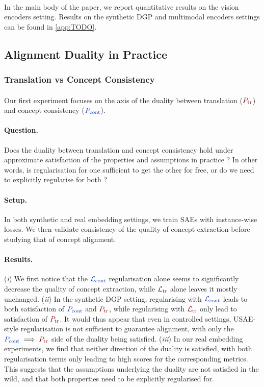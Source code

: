 \documentclass{article}
\begin{document}
\paragraph{} In the main body of the paper, we report quantitative results on the vision encoders setting. Results on the synthetic DGP and multimodal encoders settings can be found in \cref{app:TODO}.

\subsection{Alignment Duality in Practice}

\subsubsection{Translation vs Concept Consistency}
\label{sec:translation_vs_concept_consistency}

\paragraph{}Our first experiment focuses on the axis of the duality between translation ($\Ptr$) and concept consistency ($\Pcont$).
\paragraph{Question.} Does the duality between translation and concept consistency hold under approximate satisfaction of the properties and assumptions in practice ? In other words, is regularisation for one sufficient to get the other for free, or do we need to explicitly regularise for both ?
\paragraph{Setup.} In both synthetic and real embedding settings, we train SAEs with instance-wise losses. We then validate consistency of the quality of concept extraction before studying that of concept alignment.
\paragraph{Results.}
(\emph{i}) We first notice that the $\Lcont$ regularisation alone seems to significantly decrease the quality of concept extraction, while $\Ltr$ alone leaves it mostly unchanged.
%
(\emph{ii}) In the synthetic DGP setting, regularising with $\Lcont$ leads to both satisfaction of $\Pcont$ and $\Ptr$, while regularising with $\Ltr$ only lead to satisfaction of $\Ptr$. It would thus appear that even in controlled settings, USAE-style regularisation is not sufficient to guarantee alignment, with only the $\Pcont \implies \Ptr$ side of the duality being satisfied.
%
(\emph{iii}) In our real embedding experiments, we find that neither direction of the duality is satisfied, with both regularisation terms only leading to high scores for the corresponding metrics. This suggests that the assumptions underlying the duality are not satisfied in the wild, and that both properties need to be explicitly regularised for.
\end{document}
